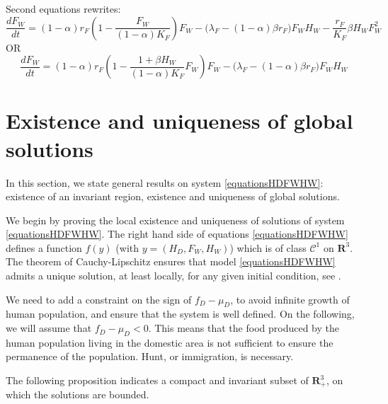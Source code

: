 \documentclass{article}
\newcommand{\lfw}{\lambda_{F}}
\newcommand{\lfw}{\lambda_{F}}
\begin{document}
Second equations rewrites:
$$
\dfrac{dF_W}{dt} = (1- \alpha)r_F \left(1 - \dfrac{F_W}{(1-\alpha)K_F} \right) F_W - \Big(\lfw - (1-\alpha) \beta r_F\Big) F_W H_W - \dfrac{r_F}{K_F} \beta H_W F_W^2
$$
OR
$$
\dfrac{dF_W}{dt} = (1- \alpha)r_F \left(1 - \dfrac{1 + \beta H_W}{(1-\alpha)K_F}F_W \right) F_W - \Big(\lfw - (1-\alpha) \beta r_F\Big) F_W H_W
$$

\section{Existence and uniqueness of global solutions}
In this section, we state general results on system \eqref{equationsHDFWHW}:  existence of an invariant region, existence and uniqueness of global solutions.

We begin by proving the local existence and uniqueness of solutions of system \eqref{equationsHDFWHW}. The right hand side of equations \eqref{equationsHDFWHW} defines a function $f(y)$ (with $y = (H_D, F_W, H_W)$) which is of class $\mathcal{C}^1$ on $\mathbf{R}^3$. The theorem of Cauchy-Lipschitz ensures that model \eqref{equationsHDFWHW} admits a unique solution, at least locally, for any given initial condition, see \cite{walter_ordinary_1998}.

We need to add a constraint on the sign of $f_D - \mu_D$, to avoid infinite growth of human population, and ensure that the system is well defined. On the following, we will assume that $f_D - \mu_D < 0$. This means that the food produced by the human population living in the domestic area is not sufficient to ensure the permanence of the population. Hunt, or immigration, is necessary. 

The following proposition indicates a compact and invariant subset of $\mathbf{R}_+^3$, on which the solutions are bounded.
\end{document}
